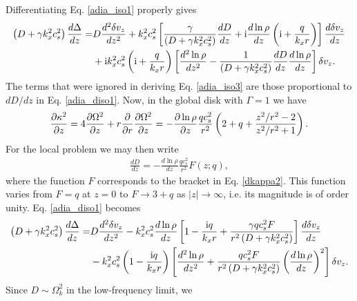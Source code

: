 Differentiating Eq. \ref{adia_iso1} properly gives
\begin{align}
  \left(D + \gamma k_x^2 c_s^2\right)\frac{d\Delta}{dz}=& D
  \frac{d^2\delta v_z}{dz^2} + k_x^2c_s^2\left[\frac{\gamma}{\left(D + \gamma k_x^2 c_s^2\right)}\frac{dD}{dz} + \mathrm{i}
    \frac{d\ln\rho}{dz}\left(\mathrm{i} +
      \frac{q}{k_xr}\right)\right]\frac{d\delta v_z}{dz}\notag\\
  &+ \mathrm{i} k_x^2 c_s^2 \left(\mathrm{i} +
      \frac{q}{k_xr}\right)\left[\frac{d^2\ln\rho}{dz^2} -
      \frac{1}{\left(D + \gamma
          k_x^2c_s^2\right)}\frac{dD}{dz}\frac{d\ln\rho}{dz}\right]\delta
    v_z. \label{adia_diso1}
\end{align}
The terms that were ignored in deriving Eq. \ref{adia_iso3} are those
proportional to $dD/dz$ in Eq. \ref{adia_diso1}. Now, in the global
disk with $\Gamma=1$ we have
\begin{align}\label{dkappa2}
  \frac{\partial\kappa^2}{\partial z} = 4 \frac{\partial\Omega^2}{\partial z} + r\frac{\partial}{\partial
    r}\frac{\partial\Omega^2}{\partial z} = -
  \frac{\partial\ln\rho}{\partial z}\frac{qc_s^2}{r^2} \left(2 + q +
    \frac{z^2/r^2-2}{z^2/r^2+1}\right). 
\end{align}
For the local problem we may then write
\begin{align}
  \frac{dD}{dz}  = - \frac{d\ln\rho}{dz}\frac{qc_s^2}{r^2}F(z;q),
\end{align}
where the function $F$ corresponds to the bracket in
Eq. \ref{dkappa2}. This function varies from $F=q$ at $z=0$ to $F\to
3+q$ as $|z|\to\infty$, i.e. its magnitude is of order unity. 
Eq. \ref{adia_diso1} becomes
\begin{align}
\left(D + \gamma k_x^2 c_s^2\right)\frac{d\Delta}{dz}=& D
  \frac{d^2\delta v_z}{dz^2} - k_x^2c_s^2\frac{d\ln\rho}{dz}\left[ 1 - 
      \frac{\mathrm{i} q}{k_xr}  +  \frac{\gamma q c_s^2F}{r^2\left(D +
        \gamma k_x^2 c_s^2\right)}\right]\frac{d\delta
    v_z}{dz}\notag\\ 
  &- k_x^2 c_s^2 \left(1 - 
      \frac{\mathrm{i} q}{k_xr}\right)\left[\frac{d^2\ln\rho}{dz^2} + 
      \frac{qc_s^2F}{r^2\left(D + \gamma
          k_x^2c_s^2\right)}\left(\frac{d\ln\rho}{dz}\right)^2\right]\delta
    v_z. \label{adia_diso2}
\end{align}
Since $D\sim \Omega_k^2$ in the low-frequency limit, we 
